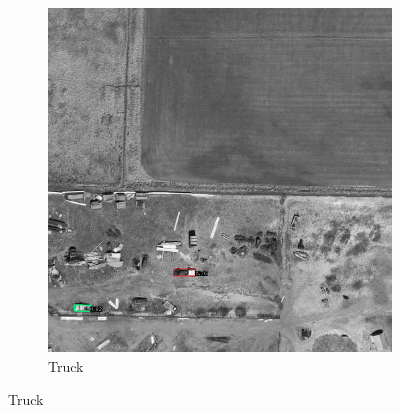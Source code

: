 \begin{figure}[h!]
\begin{subfigure}[t]{0.38\textwidth}
        \includegraphics[width=\linewidth]{images/015Results/03ablation/comp_images/green/212.png}
        \caption{Truck}
    \end{subfigure}
    

\end{figure}
